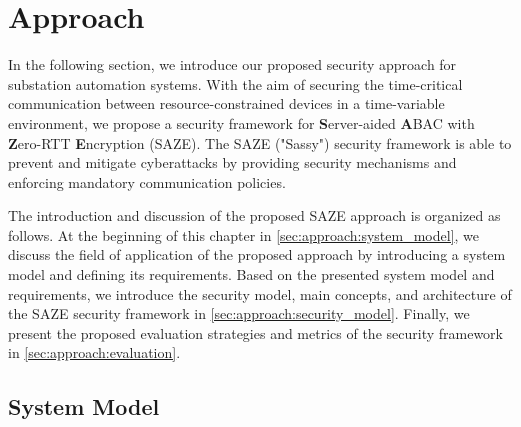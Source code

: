 \chapter{Approach}
\label{ch:approach}
In the following section, we introduce our proposed security approach for substation automation systems.
With the aim of securing the time-critical communication between resource-constrained devices in a time-variable environment, we propose a security framework for \textbf{S}erver-aided \textbf{A}BAC with \textbf{Z}ero-RTT \textbf{E}ncryption (SAZE).
The SAZE ("Sassy") security framework is able to prevent and mitigate cyberattacks by providing security mechanisms and enforcing mandatory communication policies.

The introduction and discussion of the proposed SAZE approach is organized as follows.
At the beginning of this chapter in \autoref{sec:approach:system_model}, we discuss the field of application of the proposed approach by introducing a system model and defining its requirements.
Based on the presented system model and requirements, we introduce the security model, main concepts, and architecture of the SAZE security framework in \autoref{sec:approach:security_model}.
Finally, we present the proposed evaluation strategies and metrics of the security framework in \autoref{sec:approach:evaluation}.

\section{System Model}
\label{sec:approach:system_model}

